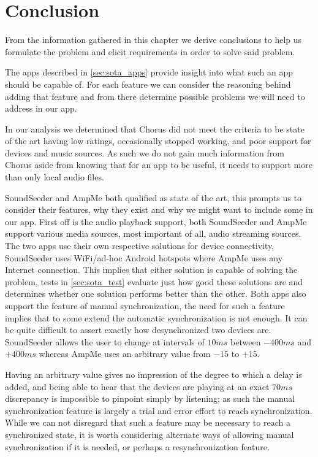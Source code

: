\section{Conclusion}
From the information gathered in this chapter we derive conclusions to help us formulate the problem and elicit requirements in order to solve said problem.

\bigskip
The apps described in \cref{sec:sota_apps} provide insight into what such an app should be capable of.
For each feature we can consider the reasoning behind adding that feature and from there determine possible problems we will need to address in our app.

In our analysis we determined that Chorus did not meet the criteria to be state of the art having low ratings, occasionally stopped working, and poor support for devices and music sources.
As such we do not gain much information from Chorus aside from knowing that for an app to be useful, it needs to support more than only local audio files.

SoundSeeder and AmpMe both qualified as state of the art, this prompts us to consider their features, why they exist and why we might want to include some in our app.
First off is the audio playback support, both SoundSeeder and AmpMe support various media sources, most important of all, audio streaming sources.
The two apps use their own respective solutions for device connectivity, SoundSeeder uses WiFi/ad-hoc Android hotspots where AmpMe uses any Internet connection.
This implies that either solution is capable of solving the problem, tests in \cref{sec:sota_test} evaluate just how good these solutions are and determines whether one solution performs better than the other.
Both apps also support the feature of manual synchronization, the need for such a feature implies that to some extend the automatic synchronization is not enough.
It can be quite difficult to assert exactly how desynchronized two devices are.
SoundSeeder allows the user to change at intervals of $10 ms$ between $-400 ms$ and $+400 ms$ whereas AmpMe uses an arbitrary value from $-15$ to $+15$.

Having an arbitrary value gives no impression of the degree to which a delay is added, and being able to hear that the devices are playing at an exact $70ms$ discrepancy is impossible to pinpoint simply by listening; as such the manual synchronization feature is largely a trial and error effort to reach synchronization.
While we can not disregard that such a feature may be necessary to reach a synchronized state, it is worth considering alternate ways of allowing manual synchronization if it is needed, or perhaps a resynchronization feature.

